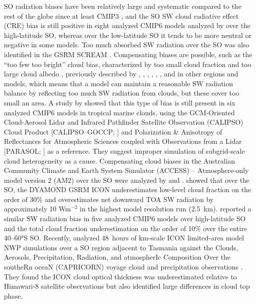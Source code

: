 \documentclass[draft]{agujournal2019}
\begin{document}
SO radiation biases have been relatively large and systematic compared to the rest of the globe since at least CMIP3 \cite{trenberth2010}, and the SO SW cloud radiative effect (CRE) bias is still positive in eight analyzed CMIP6 models analyzed by  over the high-latitude SO, whereas over the low-latitude SO it tends to be more neutral or negative in some models. Too much absorbed SW radiation over the SO was also identified in the GSRM SCREAM \cite{caldwell2021}. Compensating biases are possible, such as the ``too few too bright'' cloud bias, characterized by too small cloud fraction and too large cloud albedo \cite{wall2017,kuma2020}, previously described by , , , , , , and  in other regions and models, which means that a model can maintain a reasonable SW radiation balance by reflecting too much SW radiation from clouds, but these cover too small an area. A study by  showed that this type of bias is still present in six analyzed CMIP6 models in tropical marine clouds, using the GCM-Oriented Cloud-Aerosol Lidar and Infrared Pathfinder Satellite Observation (CALIPSO) Cloud Product [CALIPSO--GOCCP; ] and Polarization \& Anisotropy of Reflectances for Atmospheric Sciences coupled with Observations from a Lidar [PARASOL; ] as a reference. They suggest improper simulation of subgrid-scale cloud heterogeneity as a cause. Compensating cloud biases in the Australian Community Climate and Earth System Simulator (ACCESS) – Atmosphere-only model version 2 (AM2) over the SO were analyzed by  and .  showed that over the SO, the DYAMOND GSRM ICON underestimates low-level cloud fraction on the order of 30\% and overestimates net downward TOA SW radiation by approximately 10 Wm$^\mathrm{-2}$ in the highest model resolution run (2.5~km).  reported a similar SW radiation bias in five analyzed CMIP6 models over high-latitude SO and the total cloud fraction underestimation on the order of 10\% over the entire 40--60°S SO. Recently,  analyzed 48~hours of km-scale ICON limited-area model NWP simulations over a SO region adjacent to Tasmania against the Clouds, Aerosols, Precipitation, Radiation, and atmospherIc Composition Over the southeRn oceaN (CAPRICORN) voyage cloud and precipitation observations \cite{mcfarquhar2021}. They found the ICON cloud optical thickness was underestimated relative to Himawari‐8 satellite observations but also identified large differences in cloud top phase.
\end{document}
